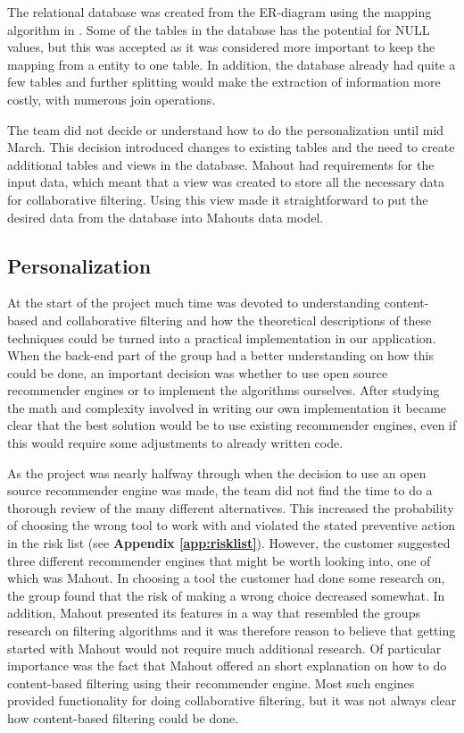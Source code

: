 The relational database was created from the ER-diagram using the mapping algorithm in \cite[p.270-278]{AS2}. Some of the tables in the database has the potential for NULL values, but this was accepted as it was considered more important to keep the mapping from a entity to one table. In addition, the database already had quite a few tables and further splitting would make the extraction of information more costly, with numerous join operations. \newline 

The team did not decide or understand how to do the personalization until mid March. This decision introduced changes to existing tables and the need to create additional tables and views in the database. Mahout had requirements for the input data, which meant that a view was created to store all the necessary data for collaborative filtering. Using this view made it straightforward to put the desired data from the database into Mahouts data model.

\subsection{Personalization}

At the start of the project much time was devoted to understanding content-based and collaborative filtering and how the theoretical descriptions of these techniques could be turned into a practical implementation in our application. When the back-end part of the group had a better understanding on how this could be done, an important decision was whether to use open source recommender engines or to implement the algorithms ourselves. After studying the math and complexity involved in writing our own implementation it became clear that the best solution would be to use existing recommender engines, even if this would require some adjustments to already written code. \newline

As the project was nearly halfway through when the decision to use an open source recommender engine was made, the team did not find the time to do a thorough review of the many different alternatives. This increased the probability of choosing the wrong tool to work with and violated the stated preventive action in the risk list (see \textbf{Appendix \ref{app:risklist}}). However, the customer suggested three different recommender engines that might be worth looking into, one of which was Mahout. In choosing a tool the customer had done some research on, the group found that the risk of making a wrong choice decreased somewhat. In addition, Mahout presented its features in a way that resembled the groups research on filtering algorithms and it was therefore reason to believe that getting started with Mahout would not require much additional research. Of particular importance was the fact that Mahout offered an short explanation on how to do content-based filtering using their recommender engine. Most such engines provided functionality for doing collaborative filtering, but it was not always clear how content-based filtering could be done.\newline

